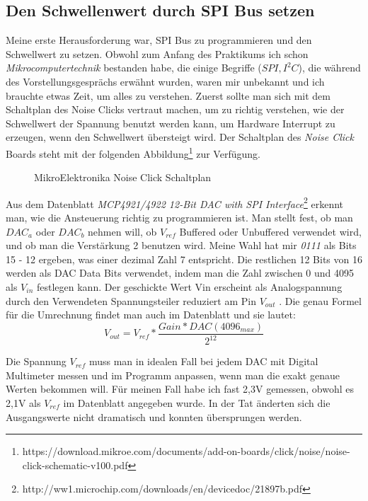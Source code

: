 \subsection{Den Schwellenwert durch SPI Bus setzen}
\label{sec:main:spi}
Meine erste Herausforderung war, SPI Bus zu programmieren und den Schwellwert zu setzen. Obwohl zum Anfang des Praktikums ich schon \textit{Mikrocomputertechnik } bestanden habe, die einige Begriffe ($SPI, I^2C$), die während des Vorstellungsgesprächs erwähnt wurden, waren mir unbekannt und ich brauchte etwas Zeit, um alles zu verstehen. Zuerst sollte man sich mit dem Schaltplan des Noise Clicks vertraut machen, um zu richtig verstehen, wie der Schwellwert der Spannung benutzt werden kann, um Hardware Interrupt zu erzeugen, wenn den Schwellwert übersteigt wird. Der Schaltplan des \textit{Noise Click} Boards steht mit der folgenden Abbildung\footnote{https://download.mikroe.com/documents/add-on-boards/click/noise/noise-click-schematic-v100.pdf} zur Verfügung. 
\begin{figure}[!hb]
	\centering
	\caption{MikroElektronika Noise Click Schaltplan}
	\label{fig:noiseShematic}
\end{figure}
Aus dem Datenblatt \textit{MCP4921/4922 12-Bit DAC with SPI Interface}\footnote{http://ww1.microchip.com/downloads/en/devicedoc/21897b.pdf} erkennt man, wie die Ansteuerung richtig zu programmieren ist. Man stellt fest, ob man $DAC_a$ oder $DAC_b$ nehmen will, ob $V_{ref}$ Buffered oder Unbuffered verwendet wird, und ob man die Verstärkung 2 benutzen wird. Meine Wahl hat mir \textit{0111} als Bits 15 - 12  ergeben, was einer dezimal Zahl 7 entspricht. Die restlichen 12 Bits von 16 werden als DAC Data Bits verwendet, indem man die Zahl zwischen 0 und 4095 als $V_{in}$ festlegen kann. Der geschickte Wert Vin erscheint als Analogspannung durch den Verwendeten Spannungsteiler reduziert am Pin $V_{out}$ . Die genau Formel für die Umrechnung findet man auch im Datenblatt und sie lautet:
\begin{equation}
V_{out} = V_{ref} * \frac{Gain * DAC(4096_{max})}{2^{12}}
\end{equation}

Die Spannung $V_{ref}$ muss man in idealen Fall bei jedem DAC mit Digital Multimeter messen und im Programm anpassen, wenn man die exakt genaue Werten bekommen will. Für meinen Fall habe ich fast 2,3V gemessen, obwohl es 2,1V als $V_{ref}$ im Datenblatt angegeben wurde. In der Tat änderten sich die Ausgangswerte nicht dramatisch und konnten übersprungen werden.

